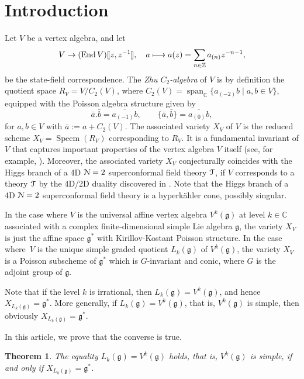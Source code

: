 \documentclass[11pt]{article}
\numberwithin{equation}{section}
\newcommand{\lcr}{[\![}
\newcommand{\rcr}{]\!]}
\newcommand\mto{\mathchoice{\longmapsto}{\mapsto}{\mapsto}{\mapsto}}
\let\mathcal \EuScript
\let\on\operatorname
\let\mc\mathcal
\newcommand\C{{\mathbb C}}
\newcommand\Z{{\mathbb Z}}
\DeclareMathOperator{\End}{End}
\newcommand \g{\mathfrak g}
\newtheorem{theorem}{Theorem}[section]
\theoremstyle{definition}
\begin{document}
\vspace*{-2\baselineskip}\vskip0pt
\section{Introduction}
Let $V$ be a vertex algebra,
and let
\[
V\to (\End V)\lcr z,z^{-1}\rcr,\quad a\mto a(z)=\sum_{n\in \Z}a_{(n)}z^{-n-1},
\]
be the state-field correspondence.
The \emph{Zhu $C_2$-algebra} \cite{Zhu96} of $V$ is by definition the quotient space
$R_V=V/C_2(V)$,
where $C_2(V)=\on{span}_{\C}\{a_{(-2)}b\mid a,b\in V\}$,
equipped with the Poisson algebra structure given by
\[
\bar a. \bar b=\overline{a_{(-1)}b},\qquad \{\bar a,\bar b\}=\overline{a_{(0)}b},
\]
for $a,b \in V$ with $\bar a := a+C_2(V)$.
The associated variety $X_V$ of $V$ is the reduced scheme
$X_V=\on{Specm}(R_V)$
corresponding to $R_V$.
It is a fundamental invariant of $V$ that captures important properties
of the vertex algebra $V$ itself (see, for example, \cite{BeiFeiMaz,Zhu96,AbeBuhDon04,Miy04,Ara12,Ara09b,A2012Dec,AM15,AM16,Arakawa-Kawasetsu}).
Moreover, the associated variety $X_V$
conjecturally \cite{BeeRas} coincides with
the Higgs branch of
a 4D $\mc{N}=2$ superconformal field theory $\mc{T}$,
if $V$ corresponds to a theory $\mc{T}$
by the 4D/2D duality discovered in \cite{BeeLemLie15}.
Note that the Higgs branch of a 4D $\mc{N}=2$ superconformal field theory
is a hyperkähler cone, possibly singular.

In the case where $V$ is
the universal affine vertex algebra $V^k(\g)$ at level $k \in\C$
associated with a complex finite-dimensional simple Lie algebra $\g$,
the variety $X_V$ is just the affine space $\g^*$ with Kirillov-Kostant Poisson structure.
In the case where~$V$ is
the unique simple graded quotient $L_k(\g)$
of $V^k(\g)$,
the variety $X_V$ is a Poisson subscheme of $\g^*$
which is $G$-invariant and conic, where $G$ is the adjoint group of $\g$.

Note that if the level $k$ is irrational,
then
$L_k(\g)=V^k(\g)$,
and hence $X_{L_k(\g)}=\g^*$.
More generally, if $L_k(\g)=V^k(\g)$, that is, $V^k(\g)$
is simple, then obviously
\hbox{$X_{L_k(\g)}=\g^*$.}

In this article, we prove that the converse is true.

\begin{theorem}\label{MainTheorem}
\label{Th:main}
The equality $L_k(\g)=V^k(\g)$ holds, that is,
$V^k(\g)$
is simple, if and only if $X_{L_k(\g)} = \g^*$.
\end{theorem}
\end{document}
